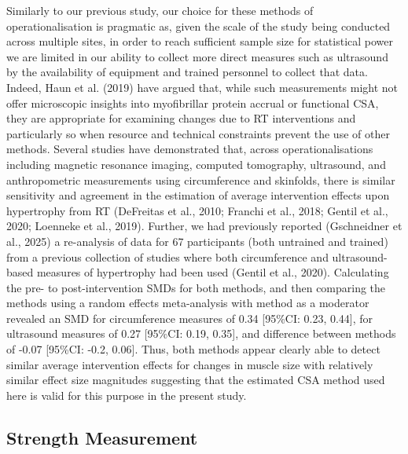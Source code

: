 \documentclass[
]{article}
\begin{document}
Similarly to our previous study, our choice for these methods of
operationalisation is pragmatic as, given the scale of the study being
conducted across multiple sites, in order to reach sufficient sample
size for statistical power we are limited in our ability to collect more
direct measures such as ultrasound by the availability of equipment and
trained personnel to collect that data. Indeed, Haun et al. (2019) have
argued that, while such measurements might not offer microscopic
insights into myofibrillar protein accrual or functional CSA, they are
appropriate for examining changes due to RT interventions and
particularly so when resource and technical constraints prevent the use
of other methods. Several studies have demonstrated that, across
operationalisations including magnetic resonance imaging, computed
tomography, ultrasound, and anthropometric measurements using
circumference and skinfolds, there is similar sensitivity and agreement
in the estimation of average intervention effects upon hypertrophy from
RT (DeFreitas et al., 2010; Franchi et al., 2018; Gentil et al., 2020;
Loenneke et al., 2019). Further, we had previously reported (Gschneidner
et al., 2025) a re-analysis of data for 67 participants (both untrained
and trained) from a previous collection of studies where both
circumference and ultrasound-based measures of hypertrophy had been used
(Gentil et al., 2020). Calculating the pre- to post-intervention SMDs
for both methods, and then comparing the methods using a random effects
meta-analysis with method as a moderator revealed an SMD for
circumference measures of 0.34 {[}95\%CI: 0.23, 0.44{]}, for ultrasound
measures of 0.27 {[}95\%CI: 0.19, 0.35{]}, and difference between
methods of -0.07 {[}95\%CI: -0.2, 0.06{]}. Thus, both methods appear
clearly able to detect similar average intervention effects for changes
in muscle size with relatively similar effect size magnitudes suggesting
that the estimated CSA method used here is valid for this purpose in the
present study.

\subsection{Strength Measurement}\label{strength-measurement}
\end{document}
